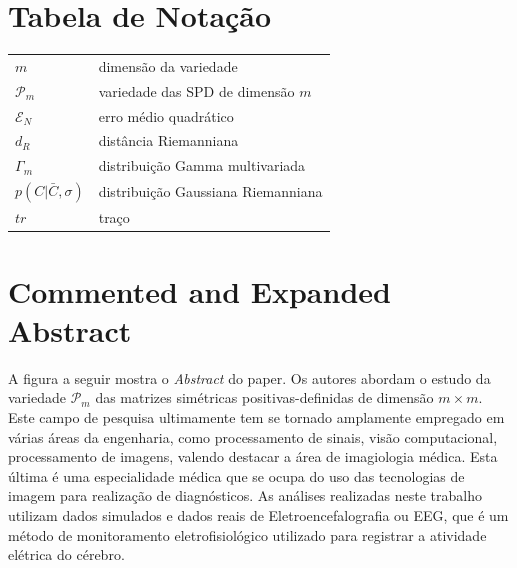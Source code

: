 \documentclass[a4paper,titlepage]{article}
\begin{document}
\section{Tabela de Notação}

\begin{table}[h]
  \begin{tabularx}{\textwidth}{@{}XX@{}}
    \toprule
    $m$ & dimensão da variedade \\
    $\mathcal{P}_m$ & variedade das SPD de dimensão $m$\\
    $\mathcal{E}_N$ & erro médio quadrático\\
    $d_R$ & distância Riemanniana\\
    $\Gamma_m$ & distribuição Gamma multivariada\\
    $p(C|\bar{C},\sigma)$ & distribuição Gaussiana Riemanniana\\
    $tr$ & traço \\
    \bottomrule
  \end{tabularx}
\end{table}

\section{Commented and Expanded Abstract}

A figura a seguir mostra o \textit{Abstract} do paper. Os autores abordam o
estudo da variedade $\mathcal{P}_m$ das matrizes simétricas positivas-definidas
de dimensão $m \times m$. Este campo de pesquisa ultimamente tem se tornado
amplamente empregado em várias áreas da engenharia, como processamento de
sinais, visão computacional, processamento de imagens, valendo destacar a área
de imagiologia médica. Esta última é uma especialidade médica que se ocupa do
uso das tecnologias de imagem para realização de diagnósticos. As análises
realizadas neste trabalho utilizam dados simulados e dados reais de
Eletroencefalografia ou EEG, que é um método de monitoramento eletrofisiológico
utilizado para registrar a atividade elétrica do cérebro. 

\begin{center}
  \vspace{1em}
  \vspace{1em}
\end{center}
\end{document}
